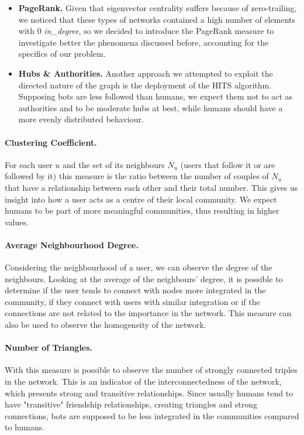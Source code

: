 \documentclass[12pt, a4paper]{article}
\begin{document}
\begin{itemize}
			\item \textbf{PageRank.} Given that eigenvector centrality suffers because of zero-trailing, we noticed that these types of networks contained a high number of elements with 0 \textit{in\_degree}, so we decided to introduce the PageRank measure to investigate better the phenomena discussed before, accounting for the specifics of our problem.
			\item \textbf{Hubs \& Authorities.} Another approach we attempted to exploit the directed nature of the graph is the deployment of the HITS algorithm. Supposing bots are less followed than humans, we expect them not to act as authorities and to be moderate hubs at best, while humans should have a more evenly distributed behaviour.
		\end{itemize}
		\paragraph{Clustering Coefficient.} For each user \(u\) and the set of its neighbours \(N_{u}\) (users that follow it or are followed by it) this measure is the ratio between the number of couples of \(N_{u}\) that have a relationship between each other and their total number. This gives us insight into how a user acts as a centre of their local community. We expect humans to be part of more meaningful communities, thus resulting in higher values.
		\paragraph{Average Neighbourhood Degree.} Considering the neighbourhood of a user, we can observe the degree of the neighbours. Looking at the average of the neighbours' degree, it is possible to determine if the user tends to connect with nodes more integrated in the community, if they connect with users with similar integration or if the connections are not related to the importance in the network. This measure can also be used to observe the homogeneity of the network.
        \paragraph{Number of Triangles.} With this measure is possible to observe the number of strongly connected triples in the network. This is an indicator of the interconnectedness of the network, which presents strong and transitive relationships. Since usually humans tend to have "transitive" friendship relationships, creating triangles and strong connections, bots are supposed to be less integrated in the communities compared to humans.
\end{document}
